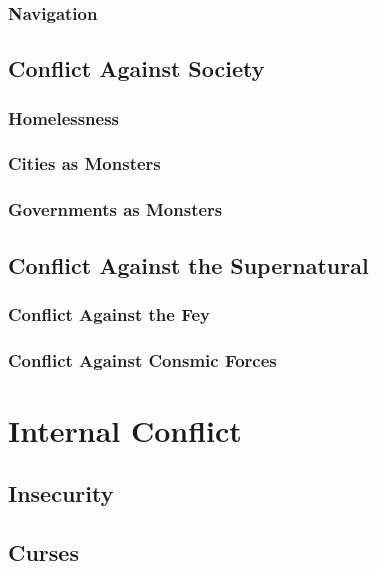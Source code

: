 \documentclass[twocolumn]{dndbook}
\begin{document}
\subsection{Navigation}


\section{Conflict Against Society}
\subsection{Homelessness}
\subsection{Cities as Monsters}
\subsection{Governments as Monsters}


\section{Conflict Against the Supernatural}
\subsection{Conflict Against the Fey}

\subsection{Conflict Against Consmic Forces}

\chapter{Internal Conflict}
\section{Insecurity}
\section{Curses}
\end{document}
